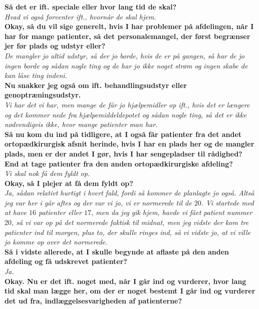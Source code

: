 \noindent
\textbf{Så det er ift. speciale eller hvor lang tid de skal?} \\
\noindent
\textit{Hvad vi også forventer ift., hvornår de skal hjem.} \\
\noindent
\textbf{Okay, så du vil sige generelt, hvis I har problemer på afdelingen, når I har for mange patienter, så det personalemangel, der først begrænser jer før plads og udstyr eller?} \\
\noindent
\textit{De mangler jo altid udstyr, så der jo borde, hvis de er på gangen, så har de jo ingen borde og sådan nogle ting og de har jo ikke noget strøm og ingen skabe de kan låse ting indeni.} \\
\noindent
\textbf{ Nu snakker jeg også om ift. behandlingsudstyr eller genoptræningsudstyr.} \\
\noindent
\textit{Vi har det vi har, men mange de får jo hjælpemidler op ift., hvis det er længere og det kommer nede fra hjælpemiddeldepotet og sådan nogle ting, så det er ikke nødvendigvis ikke, hvor mange patienter man har.} \\
\noindent
\textbf{Så nu kom du ind på tidligere, at I også får patienter fra det andet ortopædkirurgisk afsnit herinde, hvis I har en plads her og de mangler plads, men er der andet I gør, hvis I har sengepladser til rådighed? End at tage patienter fra den anden ortopædkirurgiske afdeling?} \\
\noindent
\textit{Vi skal nok få dem fyldt op. } \\
\noindent
\textbf{Okay, så I plejer at få dem fyldt op? } \\
\noindent
\textit{Ja, sådan relativt hurtigt i hvert fald, fordi så kommer de planlagte jo også. Altså jeg var her i går aftes og der var vi jo, vi er normerede til de $20$. Vi startede med at have $16$ patienter eller $17$, men da jeg gik hjem, havde vi fået patient nummer $20$, så vi var op på det normerede faktisk til midnat, men jeg vidste der kom tre patienter ind til morgen, plus to, der skulle ringes ind, så vi vidste jo, at vi ville jo komme op over det normerede.} \\
\noindent
\textbf{Så i vidste allerede, at I skulle begynde at aflaste på den anden afdeling og få udskrevet patienter?} \\
\noindent
\textit{Ja.} \\
\noindent
\textbf{Okay. Nu er det ift. noget med, når I går ind og vurderer, hvor lang tid skal man lægge her, om der er noget bestemt I går ind og vurderer det ud fra, indlæggelsesvarigheden af patienterne?} \\
